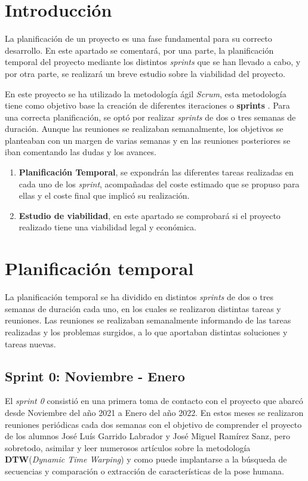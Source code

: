 
\section{Introducción}

La planificación de un proyecto es una fase fundamental para su correcto desarrollo. En este apartado se comentará, por una parte, la planificación temporal del proyecto mediante los distintos \textit{sprints} que se han llevado a cabo, y por otra parte, se realizará un breve estudio sobre la viabilidad del proyecto.

En este proyecto se ha utilizado la metodología ágil \textit{Scrum}, esta metodología tiene como objetivo base la creación de diferentes iteraciones o \textbf{sprints} \cite{trigas2012metodologia}. Para una correcta planificación, se optó por realizar \textit{sprints} de dos o tres semanas de duración. Aunque las reuniones se realizaban semanalmente, los objetivos se planteaban con un margen de varias semanas y en las reuniones posteriores se iban comentando las dudas y los avances. 


\begin{enumerate}
    \item \textbf{Planificación Temporal}, se expondrán las diferentes tareas realizadas en cada uno de los \textit{sprint}, acompañadas del coste estimado que se propuso para ellas y el coste final que implicó su realización. 
    \item \textbf{Estudio de viabilidad}, en este apartado se comprobará si el proyecto realizado tiene una viabilidad legal y económica.
\end{enumerate}
\newpage
\section{Planificación temporal}
La planificación temporal se ha dividido en distintos \textit{sprints} de dos o tres semanas de duración cada uno, en los cuales se realizaron distintas tareas y reuniones. Las reuniones se realizaban semanalmente informando de las tareas realizadas y los problemas surgidos, a lo que aportaban distintas soluciones y tareas nuevas. 


\subsection{Sprint 0:  Noviembre - Enero}

El \textit{sprint 0} consistió en una primera toma de contacto con el proyecto que abarcó desde Noviembre del año 2021 a Enero del año 2022. En estos meses se realizaron reuniones periódicas cada dos semanas con el objetivo de comprender el proyecto de los alumnos José Luís Garrido Labrador y José Miguel Ramírez Sanz, pero sobretodo, asimilar y leer numerosos artículos sobre la metodología \textbf{DTW}(\textit{Dynamic Time Warping}) y como puede implantarse a la búsqueda de secuencias y comparación o extracción de características de la pose humana.


